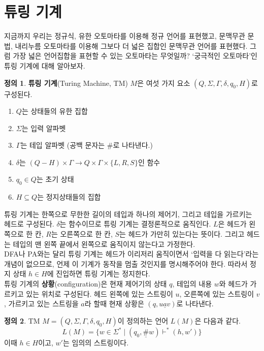 \documentclass[b5paper, 10pt]{book}
\theoremstyle{definition}
\newtheorem{defn}{정의}[chapter]
\begin{document}
\section{튜링 기계} \label{turing machine}
지금까지 우리는 정규식, 유한 오토마타를 이용해 정규 언어를 표현했고, 문맥무관 문법, 내리누름 오토마타를
이용해 그보다 더 넓은 집합인 문맥무관 언어를 표현했다. 
그럼 가장 넓은 언어집합을 표현할 수 있는 오토마타는 무엇일까?
`궁극적인 오토마타'인 튜링 기계에 대해 알아보자. 
\begin{defn}
    \textbf{튜링 기계}(Turing Machine, TM) $M$은 여섯 가지 요소 $(Q, \Sigma, \Gamma, 
    \delta, q_0, H)$로
    구성된다. 
    \begin{enumerate}
        \item $Q$는 상태들의 유한 집합
        \item $\Sigma$는 입력 알파벳
        \item $\Gamma$는 테입 알파벳 (공백 문자는 \#로 나타낸다.)
        \item $\delta$는 $(Q - H) \times \Gamma \rightarrow Q \times 
        \Gamma \times \{L, R, S\}$인 함수
        \item $q_0 \in Q$는 초기 상태
        \item $H \subseteq Q$는 정지상태들의 집합
    \end{enumerate}
\end{defn}
튜링 기계는 한쪽으로 무한한 길이의 테입과 하나의 제어기, 그리고 테입을 가르키는 헤드로 구성된다.
$\delta$는 함수이므로 튜링 기계는 결정론적으로 움직인다. $L$은 헤드가 왼쪽으로 한 칸, $R$는
오른쪽으로 한 칸, $S$는 헤드가 가만히 있는다는 뜻이다. 그리고
헤드는 테입의 맨 왼쪽 끝에서 왼쪽으로 움직이지 않는다고 가정한다.\\ 
DFA나 PA와는 달리 튜링 기계는 헤드가 이리저리 움직이면서 `입력을 다 읽는다'라는 개념이 없으므로, 언제 
이 기계가 동작을 멈출 것인지를 명시해주어야 한다. 따라서 정지 상태 $h \in H$에 진입하면 튜링 기계는 정지한다.  \\ 
튜링 기계의 \textbf{상황}(configuration)은 현재 제어기의 상태 $q$, 테입의 내용 $w$와 헤드가 가르키고 있는 위치로 구성된다.
헤드 왼쪽에 있는 스트링이 $u$, 오른쪽에 있는 스트링이 $v$, 가르키고 있는 스트링을 $a$라 할때 현재 상황은
$(q, u\underline{a}v)$로 나타낸다.  
\begin{defn}
    TM $M = (Q, \Sigma, \Gamma, \delta, q_0, H)$이 정의하는 언어 $L(M)$은 다음과 같다.
    $$ L(M) = \{ w \in \Sigma^*  \;\vert\;  (q_0, \underline{\#}w) \vdash^* (h, w') \} $$
    이때 $h\in H$이고, $w'$는 임의의 스트링이다.  
\end{defn}
\end{document}
